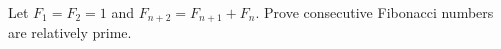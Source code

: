 Let $F_1=F_2=1$ and $F_{n+2}=F_{n+1}+F_n$. Prove consecutive Fibonacci numbers are relatively prime.
